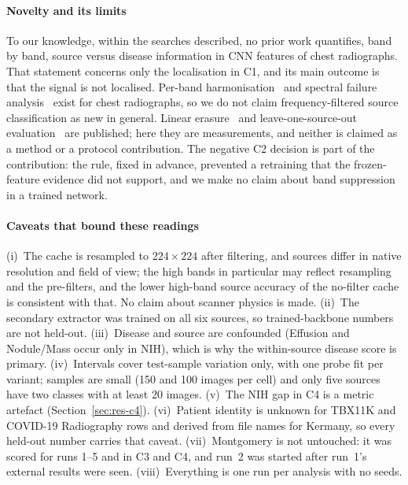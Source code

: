 \paragraph{Novelty and its limits} To our knowledge, within the searches described, no prior work quantifies, band by band, source versus disease information in CNN features of chest radiographs. That statement concerns only the localisation in C1, and its main outcome is that the signal is not localised. Per-band harmonisation~\cite{kim2023homogenization} and spectral failure analysis~\cite{halimi2026spectral} exist for chest radiographs, so we do not claim frequency-filtered source classification as new in general. Linear erasure~\cite{ravfogel2020null,belrose2023leace} and leave-one-source-out evaluation~\cite{yao2019strong} are published; here they are measurements, and neither is claimed as a method or a protocol contribution. The negative C2 decision is part of the contribution: the rule, fixed in advance, prevented a retraining that the frozen-feature evidence did not support, and we make no claim about band suppression in a trained network.

\paragraph{Caveats that bound these readings}
(i)~The cache is resampled to $224\times224$ after filtering, and sources differ in native resolution and field of view; the high bands in particular may reflect resampling and the pre-filters, and the lower high-band source accuracy of the no-filter cache is consistent with that. No claim about scanner physics is made. (ii)~The secondary extractor was trained on all six sources, so trained-backbone numbers are not held-out. (iii)~Disease and source are confounded (Effusion and Nodule/Mass occur only in NIH), which is why the within-source disease score is primary. (iv)~Intervals cover test-sample variation only, with one probe fit per variant; samples are small (150 and 100 images per cell) and only five sources have two classes with at least 20 images. (v)~The NIH gap in C4 is a metric artefact (Section~\ref{sec:res-c4}). (vi)~Patient identity is unknown for TBX11K and COVID-19 Radiography rows and derived from file names for Kermany, so every held-out number carries that caveat. (vii)~Montgomery is not untouched: it was scored for runs 1--5 and in C3 and C4, and run~2 was started after run~1's external results were seen. (viii)~Everything is one run per analysis with no seeds.

